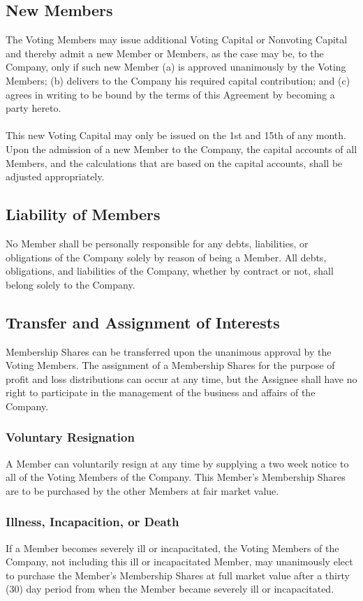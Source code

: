 \documentclass[11pt]{article}
\begin{document}
\subsection{New Members}
The Voting Members may issue additional Voting Capital or Nonvoting Capital and thereby admit a new Member or Members, as the case may be, to the Company, only if such new Member (a) is approved unanimously by the Voting Members; (b) delivers to the Company his required capital contribution; and (c) agrees in writing to be bound by the terms of this Agreement by becoming a party hereto.\\\\
This new Voting Capital may only be issued on the 1st and 15th of any month. Upon the admission of a new Member to the Company, the capital accounts of all Members, and the calculations that are based on the capital accounts, shall be adjusted appropriately.

\subsection{Liability of Members}
No Member shall be personally responsible for any debts, liabilities, or obligations of the Company solely by reason of being a Member. All debts, obligations, and liabilities of the Company, whether by contract or not, shall belong solely to the Company.

\subsection{Transfer and Assignment of Interests}
Membership Shares can be transferred upon the unanimous approval by the Voting Members. The assignment of a Membership Shares for the purpose of profit and loss distributions can occur at any time, but the Assignee shall have no right to participate in the management of the business and affairs of the Company.

\subsubsection{Voluntary Resignation}
A Member can voluntarily resign at any time by supplying a two week notice to all of the Voting Members of the Company. This Member’s Membership Shares are to be purchased by the other Members at fair market value.

\subsubsection{Illness, Incapacition, or Death}
If a Member becomes severely ill or incapacitated, the Voting Members of the Company, not including this ill or incapacitated Member, may unanimously elect to purchase the Member's Membership Shares at full market value after a thirty (30) day period from when the Member became severely ill or incapacitated.
\end{document}
